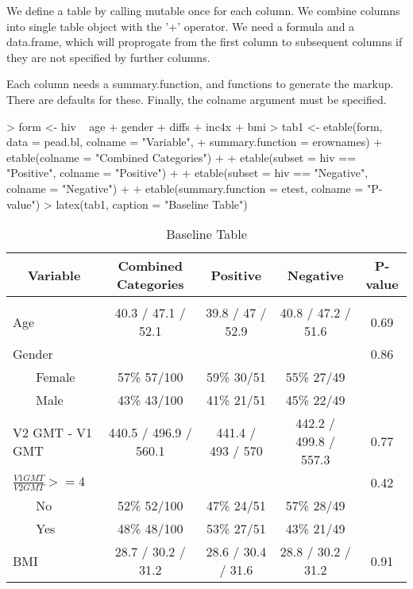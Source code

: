 \documentclass{article}
\begin{document}
We define a table by calling mutable once for each column. We combine
columns into single table object with the '+' operator. We need a
formula and a data.frame, which will proprogate from the first column
to subsequent columns if they are not specified by further columns.

Each column needs a summary.function, and functions to generate the
markup. There are defaults for these. Finally, the colname argument
must be specified.

\small{
\begin{Schunk}
\begin{Sinput}
> form <- hiv ~ age + gender + diffs + inc4x + bmi
> tab1 <- etable(form, data = pead.bl, colname = "Variable", 
+     summary.function = erownames) + etable(colname = "Combined Categories") + 
+     etable(subset = hiv == "Positive", colname = "Positive") + 
+     etable(subset = hiv == "Negative", colname = "Negative") + 
+     etable(summary.function = etest, colname = "P-value")
> latex(tab1, caption = "Baseline Table")
\end{Sinput}
\begin{table}
\begin{tabular}{lcccc}
\multicolumn{1}{c}{ Variable }&\multicolumn{1}{c}{ Combined Categories }&\multicolumn{1}{c}{ Positive }&\multicolumn{1}{c}{ Negative }&\multicolumn{1}{c}{ P-value }
\\
\hline\\ 
Age&40.3 / 47.1 / 52.1&39.8 / 47 / 52.9&40.8 / 47.2 / 51.6&0.69\\
Gender&&&&0.86\\
~~~ Female&57\% 57/100&59\% 30/51&55\% 27/49&\\
~~~ Male&43\% 43/100&41\% 21/51&45\% 22/49&\\
V2 GMT - V1 GMT&440.5 / 496.9 / 560.1&441.4 / 493 / 570&442.2 / 499.8 / 557.3&0.77\\
$\frac{V1 GMT}{V2 GMT} >= 4$&&&&0.42\\
~~~ No&52\% 52/100&47\% 24/51&57\% 28/49&\\
~~~ Yes&48\% 48/100&53\% 27/51&43\% 21/49&\\
BMI&28.7 / 30.2 / 31.2&28.6 / 30.4 / 31.6&28.8 / 30.2 / 31.2&0.91 \\
\end{tabular}
\caption{Baseline Table}
\end{table} \end{Schunk}
}
\end{document}
